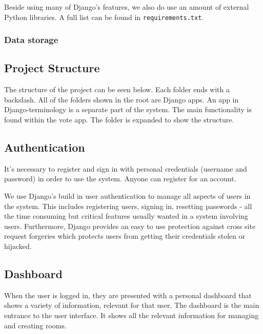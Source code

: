 Beside using many of Django's features, we also do use an amount of external Python libraries. A full list can be found in \texttt{requirements.txt}.

\subsubsection{Data storage}


\subsection{Project Structure}
The structure of the project can be seen below. Each folder ends with a backslash. All of the folders shown in the root are Django apps. An app in Django-terminology is a separate part of the system. The main functionality is found within the vote app. The folder is expanded to show the structure.




\subsection{Authentication}
It's necessary to register and sign in with personal credentials (username and password) in order to use the system. Anyone can register for an account. 

We use Django's build in user authentication to manage all aspects of users in the system. This includes registering users, signing in, resetting passwords - all the time consuming but critical features usually wanted in a system involving users. Furthermore, Django provides an easy to use protection against cross site request forgeries which protects users from getting their credentials stolen or hijacked.

\subsection{Dashboard}
When the user is logged in, they are presented with a personal dashboard that shows a variety of information, relevant for that user.
The dashboard is the main entrance to the user interface. It shows all the relevant information for managing and creating rooms. 

